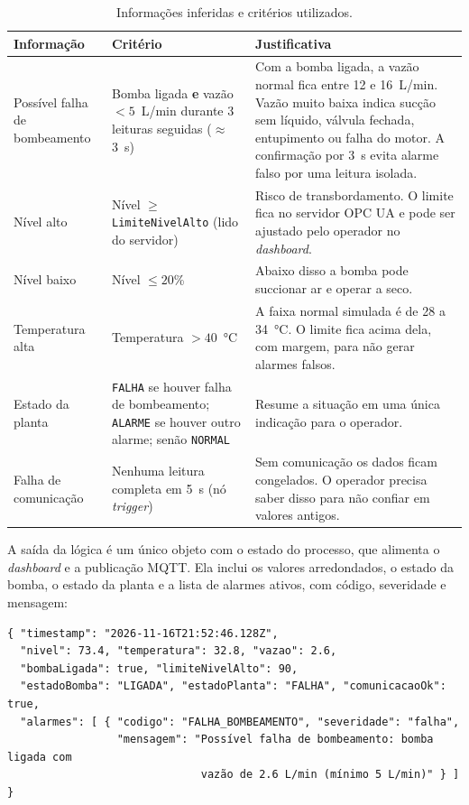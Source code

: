 \documentclass[11pt,a4paper]{article}
\begin{document}
\begin{table}[H]
\centering
\small
\caption{Informações inferidas e critérios utilizados.}
\label{tab:logica}
\begin{tabularx}{\linewidth}{@{}>{\raggedright\arraybackslash}p{3.3cm} >{\raggedright\arraybackslash}p{4.6cm} L@{}}
\toprule
\textbf{Informação} & \textbf{Critério} & \textbf{Justificativa} \\
\midrule
Possível falha de bombeamento &
Bomba ligada \textbf{e} vazão $< 5$~L/min durante 3 leituras seguidas ($\approx$3~s) &
Com a bomba ligada, a vazão normal fica entre 12 e 16~L/min. Vazão muito baixa
indica sucção sem líquido, válvula fechada, entupimento ou falha do motor. A
confirmação por 3~s evita alarme falso por uma leitura isolada. \\
\addlinespace
Nível alto &
Nível $\geq$ \texttt{LimiteNivelAlto} (lido do servidor) &
Risco de transbordamento. O limite fica no servidor OPC UA e pode ser
ajustado pelo operador no \emph{dashboard}. \\
\addlinespace
Nível baixo &
Nível $\leq 20$\% &
Abaixo disso a bomba pode succionar ar e operar a seco. \\
\addlinespace
Temperatura alta &
Temperatura $> 40$~°C &
A faixa normal simulada é de 28 a 34~°C. O limite fica acima dela, com
margem, para não gerar alarmes falsos. \\
\addlinespace
Estado da planta &
\texttt{FALHA} se houver falha de bombeamento; \texttt{ALARME} se houver outro
alarme; senão \texttt{NORMAL} &
Resume a situação em uma única indicação para o operador. \\
\addlinespace
Falha de comunicação &
Nenhuma leitura completa em 5~s (nó \emph{trigger}) &
Sem comunicação os dados ficam congelados. O operador precisa saber disso
para não confiar em valores antigos. \\
\bottomrule
\end{tabularx}
\end{table}

A saída da lógica é um único objeto com o estado do processo, que alimenta o
\emph{dashboard} e a publicação MQTT. Ela inclui os valores arredondados, o
estado da bomba, o estado da planta e a lista de alarmes ativos, com código,
severidade e mensagem:

\begin{lstlisting}
{ "timestamp": "2026-11-16T21:52:46.128Z",
  "nivel": 73.4, "temperatura": 32.8, "vazao": 2.6,
  "bombaLigada": true, "limiteNivelAlto": 90,
  "estadoBomba": "LIGADA", "estadoPlanta": "FALHA", "comunicacaoOk": true,
  "alarmes": [ { "codigo": "FALHA_BOMBEAMENTO", "severidade": "falha",
                 "mensagem": "Possível falha de bombeamento: bomba ligada com
                              vazão de 2.6 L/min (mínimo 5 L/min)" } ] }
\end{lstlisting}
\end{document}

